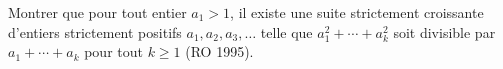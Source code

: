 Montrer que pour tout entier $a_1 > 1$, il existe une suite strictement croissante d'entiers strictement positifs $a_1, a_2, a_3, \ldots$ telle que $a_1^2 + \cdots + a_k^2$ soit divisible par $a_1 + \cdots + a_k$ pour tout $k \geq 1$ (RO 1995).

